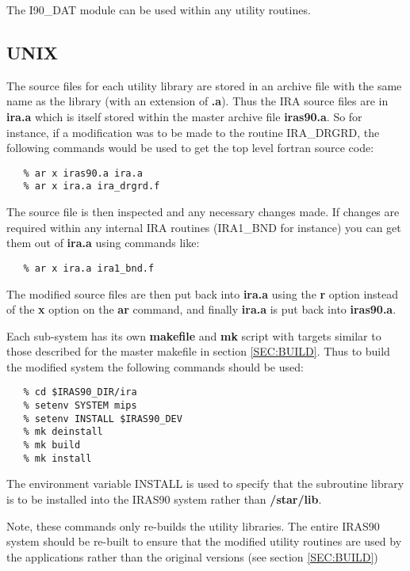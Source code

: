 The {\small I90\_DAT} module can be used within any utility routines.

\subsection{UNIX}
The source files for each utility library are stored in an archive file with the 
same name as the library (with an extension of {\bf .a}). Thus the {\small IRA} 
source files are in {\bf ira.a} which is itself stored within the master archive 
file {\bf iras90.a}. So for instance, if a modification was to be made to the 
routine {\small IRA\_DRGRD}, the following commands would be used to get the 
top level fortran source code:

\small
\begin{verbatim}
   % ar x iras90.a ira.a
   % ar x ira.a ira_drgrd.f
\end{verbatim}
\normalsize

The source file is then inspected and any necessary changes made. If changes are 
required within any internal {\small IRA} routines ({\small IRA1\_BND} for 
instance) you can get them out of {\bf ira.a} using commands like:

\small
\begin{verbatim}
   % ar x ira.a ira1_bnd.f
\end{verbatim}
\normalsize

The modified source files are then put back into {\bf ira.a} using the {\bf r} 
option instead of the {\bf x} option on the {\bf ar} command, and finally {\bf
ira.a} is put back into {\bf iras90.a}.

Each sub-system has its own {\bf makefile} and {\bf mk} script with targets 
similar to those described for the master makefile in section \ref{SEC:BUILD}. 
Thus to build the modified system the following commands should be used:

\small
\begin{verbatim}
   % cd $IRAS90_DIR/ira
   % setenv SYSTEM mips
   % setenv INSTALL $IRAS90_DEV
   % mk deinstall
   % mk build
   % mk install
\end{verbatim}
\normalsize

The environment variable {\small INSTALL} is used to specify that the subroutine
library is to be installed into the {\small IRAS90} system rather than {\bf
/star/lib}. 

Note, these commands only re-builds the utility libraries. The entire {\small 
IRAS90} system should be re-built to ensure that the modified utility routines
are used by the applications rather than the original versions (see section 
\ref{SEC:BUILD})

